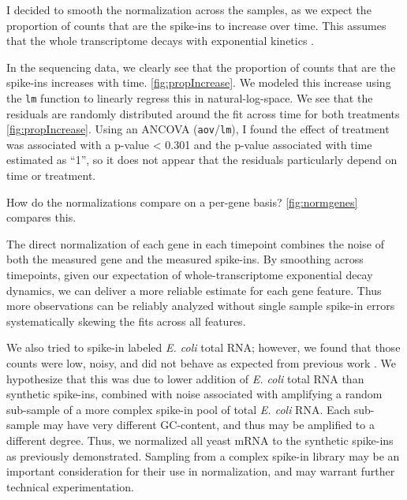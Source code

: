 I decided to smooth the normalization across the samples, as we expect
the proportion of counts that are the spike-ins to increase over time.
This assumes that the whole transcriptome decays with exponential
kinetics \parencite{petersen1976half}.

In the sequencing data, we clearly see that the proportion of counts
that are the spike-ins increases with time.
\autoref{fig:propIncrease}.
We modeled this increase using the \texttt{lm} function to linearly
regress this in natural-log-space. We see that
the residuals are randomly distributed around the fit across time 
for both treatments \autoref{fig:propIncrease}.
Using an ANCOVA (\texttt{aov}/\texttt{lm}), I found the effect of 
treatment was associated with a p-value < 0.301 and the p-value
associated with time estimated as ``1'', so it does not appear that the
residuals particularly depend on time or treatment.


How do the normalizations compare on a per-gene basis? 
\ref{fig:normgenes} compares this.



The direct normalization of each gene in each timepoint combines the 
noise of both the measured gene and the measured spike-ins. 
By smoothing across timepoints, 
given our expectation of whole-transcriptome exponential
decay dynamics, we can deliver a more reliable estimate for each gene
feature. Thus more observations can be reliably analyzed
without single sample spike-in errors systematically skewing the fits
across all features.

We also tried to spike-in labeled \textit{E. coli} total RNA; 
however, we found
that those counts were low, noisy, and did not behave as expected
from previous work \parencite{neymotin2014determination}. We
hypothesize that this was due to lower addition of \textit{E. coli} 
total RNA than synthetic spike-ins, 
combined with noise associated with amplifying a
random sub-sample of a more complex spike-in pool of total \textit{E.
coli} RNA. Each sub-sample may have very different GC-content, and
thus may be amplified to a different degree.
Thus, we normalized all yeast mRNA to the synthetic spike-ins as
previously demonstrated.
Sampling from a complex spike-in library may be an important
consideration for their use in normalization, and may warrant further
technical experimentation.


